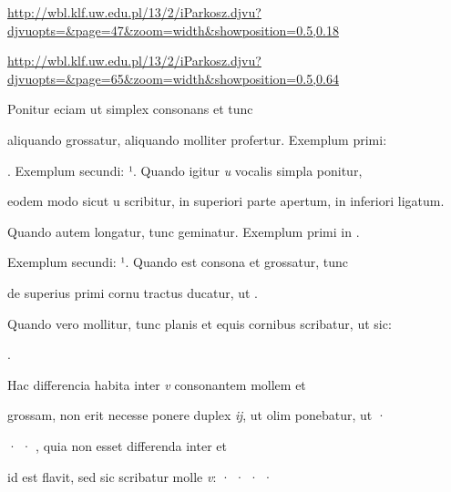 

{
\url{http://wbl.klf.uw.edu.pl/13/2/iParkosz.djvu?djvuopts=&page=47&zoom=width&showposition=0.5,0.18}

\url{http://wbl.klf.uw.edu.pl/13/2/iParkosz.djvu?djvuopts=&page=65&zoom=width&showposition=0.5,0.64}
}

\bigskip

\obeylines
\mono
\fullpreviouslines


{
\color{blue}
Ponitur eciam ut simplex consonans et tunc

}

\fulllines



aliquando grossatur, aliquando molliter profertur. Exemplum primi:  

. Exemplum secundi:  ¹. Quando igitur \textit{u} vocalis simpla ponitur, 

eodem modo sicut u scribitur, in superiori parte apertum, in inferiori ligatum. 

Quando autem longatur, tunc geminatur. Exemplum primi in  .



Exemplum secundi:  ¹. Quando est consona et grossatur, tunc

de superius primi cornu tractus ducatur, ut   .

Quando vero mollitur, tunc planis et equis cornibus scribatur, ut sic: 

\splitlines

 .

\indentK Hac differencia habita inter \textit{v} consonantem mollem et

\fulllines

grossam, non erit necesse ponere duplex \textit{ĳ}, ut olim ponebatur,  ut ·

· · , quia non esset differenda inter  et 

id est flavit, sed sic scribatur molle \textit{v}: · · · ·

